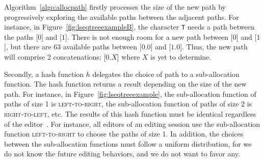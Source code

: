 


Algorithm~\ref{algo:allocpath} firstly processes the size of the new path by
progressively exploring the available paths between the adjacent paths. For
instance, in Figure~\ref{fig:lseqtreeexampleB}, the character \texttt{T} needs a
path between the paths [$0$] and [$1$]. There is not enough room for a new path
between [$0$] and [$1$], but there are $63$ available paths
between [$0.0$] and [$1.0$]. Thus, the new path will comprise 2 concatenations:
[$0.X$] where $X$ is yet to determine.

\noindent Secondly, a hash function $h$ delegates the choice of path to a
sub-allocation function. The hash function returns a result depending on the
size of the new path. For instance, in Figure~\ref{fig:lseqtreeexample}, the
sub-allocation function of paths of size 1 is \textsc{left-to-right}, the
sub-allocation function of paths of size 2 is \textsc{right-to-left}, etc. The
results of this hash function must be identical regardless of the
editor~\cite{nedelec2013concurrency}. For instance, all editors of an editing
session use the sub-allocation function \textsc{left-to-right} to choose the
paths of size 1. In addition, the choices between the sub-allocation functions
must follow a uniform distribution, for we do not know the future editing
behaviors, and we do not want to favor any.





